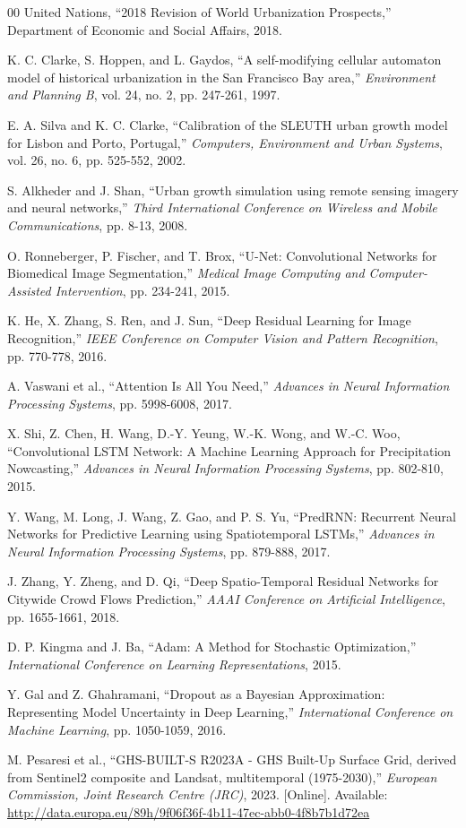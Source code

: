 \documentclass[conference]{IEEEtran}
\begin{document}
\begin{thebibliography}{00}
 United Nations, ``2018 Revision of World Urbanization Prospects,'' Department of Economic and Social Affairs, 2018.

 K. C. Clarke, S. Hoppen, and L. Gaydos, ``A self-modifying cellular automaton model of historical urbanization in the San Francisco Bay area,'' \textit{Environment and Planning B}, vol. 24, no. 2, pp. 247-261, 1997.

 E. A. Silva and K. C. Clarke, ``Calibration of the SLEUTH urban growth model for Lisbon and Porto, Portugal,'' \textit{Computers, Environment and Urban Systems}, vol. 26, no. 6, pp. 525-552, 2002.

 S. Alkheder and J. Shan, ``Urban growth simulation using remote sensing imagery and neural networks,'' \textit{Third International Conference on Wireless and Mobile Communications}, pp. 8-13, 2008.

 O. Ronneberger, P. Fischer, and T. Brox, ``U-Net: Convolutional Networks for Biomedical Image Segmentation,'' \textit{Medical Image Computing and Computer-Assisted Intervention}, pp. 234-241, 2015.

 K. He, X. Zhang, S. Ren, and J. Sun, ``Deep Residual Learning for Image Recognition,'' \textit{IEEE Conference on Computer Vision and Pattern Recognition}, pp. 770-778, 2016.

 A. Vaswani et al., ``Attention Is All You Need,'' \textit{Advances in Neural Information Processing Systems}, pp. 5998-6008, 2017.

 X. Shi, Z. Chen, H. Wang, D.-Y. Yeung, W.-K. Wong, and W.-C. Woo, ``Convolutional LSTM Network: A Machine Learning Approach for Precipitation Nowcasting,'' \textit{Advances in Neural Information Processing Systems}, pp. 802-810, 2015.

 Y. Wang, M. Long, J. Wang, Z. Gao, and P. S. Yu, ``PredRNN: Recurrent Neural Networks for Predictive Learning using Spatiotemporal LSTMs,'' \textit{Advances in Neural Information Processing Systems}, pp. 879-888, 2017.

 J. Zhang, Y. Zheng, and D. Qi, ``Deep Spatio-Temporal Residual Networks for Citywide Crowd Flows Prediction,'' \textit{AAAI Conference on Artificial Intelligence}, pp. 1655-1661, 2018.

 D. P. Kingma and J. Ba, ``Adam: A Method for Stochastic Optimization,'' \textit{International Conference on Learning Representations}, 2015.

 Y. Gal and Z. Ghahramani, ``Dropout as a Bayesian Approximation: Representing Model Uncertainty in Deep Learning,'' \textit{International Conference on Machine Learning}, pp. 1050-1059, 2016.

 M. Pesaresi et al., ``GHS-BUILT-S R2023A - GHS Built-Up Surface Grid, derived from Sentinel2 composite and Landsat, multitemporal (1975-2030),'' \textit{European Commission, Joint Research Centre (JRC)}, 2023. [Online]. Available: \url{http://data.europa.eu/89h/9f06f36f-4b11-47ec-abb0-4f8b7b1d72ea}
\end{thebibliography}
\end{document}
